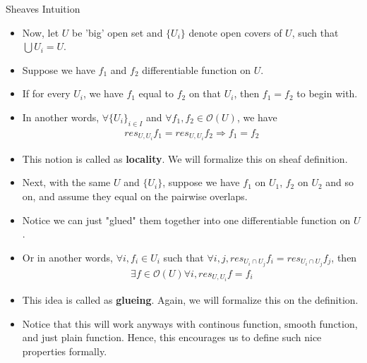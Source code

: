 \documentclass[10pt,aspectratio=1610]{beamer}
\theoremstyle{definition}
\begin{document}
    \begin{frame}{Sheaves Intuition}
        \begin{itemize}
            \item Now, let $U$ be 'big' open set and $\{U_i\}$ denote open covers of $U$, such that $\bigcup U_i = U$.
            \item Suppose we have $f_1$ and $f_2$ differentiable function on $U$. 
            \item If for every $U_i$, we have $f_1$ equal to $f_2$ on that $U_i$, then $f_1 = f_2$ to begin with. 
            \item In another words, $\forall \{U_i\}_{i\in I}$ and $\forall f_1, f_2 \in \mathcal{O}(U)$, we have
            \begin{align*}
                res_{U, U_i} f_1 = res_{U, U_i}f_2 \Longrightarrow f_1 = f_2
            \end{align*}
            \item This notion is called as \textbf{locality}. We will formalize this on sheaf definition.
        \end{itemize}
    \end{frame}

    \begin{frame}
        \begin{itemize}
            \item Next, with the same $U$ and $\{U_i\}$, suppose we have $f_1$ on $U_1$, $f_2$ on $U_2$ and so on, and assume they equal on the pairwise overlaps. 
            \item Notice we can just "glued" them together into one differentiable function on $U$. 
            \item Or in another words, $\forall i, f_i \in U_i$ such that $\forall i,j, res_{U_i \cap U_j} f_i = res_{U_i \cap U_j} f_j $, then 
            \begin{align*}
                \exists f \in \mathcal{O}(U) \forall i, res_{U, U_i} f = f_i
            \end{align*}
            \item This idea is called as \textbf{glueing}. Again, we will formalize this on the definition. 
            \item Notice that this will work anyways with continous function, smooth function, and just plain function. Hence, this encourages us to define such nice properties formally.
        \end{itemize}
        
    \end{frame}
\end{document}
